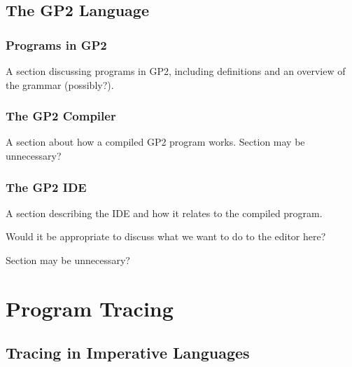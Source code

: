 \documentclass[authoryearcitations]{UoYCSproject}
\begin{document}
\subsection{The GP2 Language}
\label{sec:TheGP2Language}


\subsubsection{Programs in GP2}
\label{sec:ProgramsInGP2}

A section discussing programs in GP2, including definitions and an overview of
the grammar (possibly?).


\subsubsection{The GP2 Compiler}
\label{sec:TheGP2Compiler}

A section about how a compiled GP2 program works.
Section may be unnecessary?


\subsubsection{The GP2 IDE}
\label{sec:TheGP2IDE}

A section describing the IDE and how it relates to the compiled program. 

Would it be appropriate to discuss what we want to do to the editor here?

Section may be unnecessary?


\section{Program Tracing}
\label{sec:ProgramTracing}


\subsection{Tracing in Imperative Languages}
\label{sec:TracingInImperativeLanguages}
\end{document}
